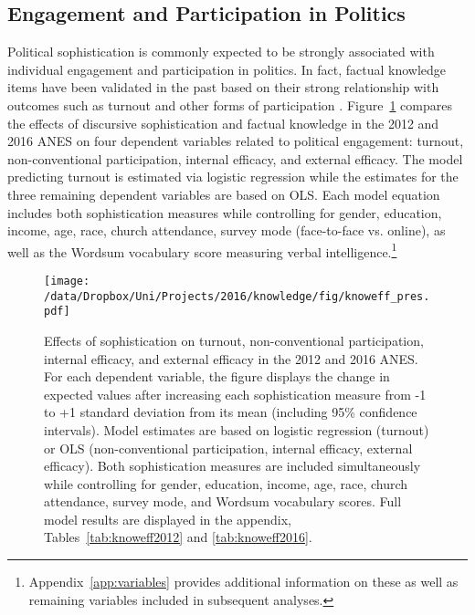 \subsection*{Engagement and Participation in Politics}
Political sophistication is commonly expected to be strongly associated with individual engagement and participation in politics. In fact, factual knowledge items have been validated in the past based on their strong relationship with outcomes such as turnout and other forms of participation \citep[230--233]{lupia2015uninformed}. Figure~\ref{fig:knoweff} compares the effects of discursive sophistication and factual knowledge in the 2012 and 2016 ANES on four dependent variables related to political engagement: turnout, non-conventional participation, internal efficacy, and external efficacy. The model predicting turnout is estimated via logistic regression while the estimates for the three remaining dependent variables are based on OLS. Each model equation includes both sophistication measures while controlling for gender, education, income, age, race, church attendance, survey mode (face-to-face vs. online), as well as the Wordsum vocabulary score measuring verbal intelligence.\footnote{Appendix~\ref{app:variables} provides additional information on these as well as remaining variables included in subsequent analyses.}

\begin{figure}[h]\centering
\texttt{[image: /data/Dropbox/Uni/Projects/2016/knowledge/fig/knoweff\_pres.pdf]}
\caption[Effects of sophistication on turnout, non-conventional participation, internal efficacy, and external efficacy in the 2012 and 2016 ANES]{Effects of sophistication on turnout, non-conventional participation, internal efficacy, and external efficacy in the 2012 and 2016 ANES. For each dependent variable, the figure displays the change in expected values after increasing each sophistication measure from -1 to +1 standard deviation from its mean (including 95\% confidence intervals). Model estimates are based on logistic regression (turnout) or OLS (non-conventional participation, internal efficacy, external efficacy). Both sophistication measures are included simultaneously while controlling for gender, education, income, age, race, church attendance, survey mode, and Wordsum vocabulary scores. Full model results are displayed in the appendix, Tables~\ref{tab:knoweff2012} and \ref{tab:knoweff2016}.}\label{fig:knoweff}
\end{figure}

